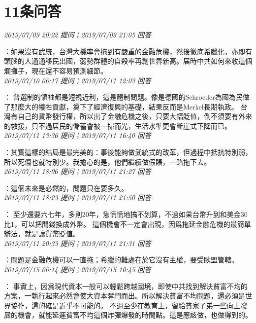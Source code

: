 \documentclass[twocolumn]{ctexart}
\begin{document}
\section{11条问答}

\textit{\hfill\noindent\small 2019/07/09 20:22 提问；2019/07/09 21:05 回答}

：如果沒有武統，台灣大機率會拖到有嚴重的金融危機，然後徹底希臘化，亦即有頭腦的人通通移民出國，弱勢群體的自殺率再創世界新高。届時中共如何來收這個爛攤子，現在還不容易預測細節。
\\

\textit{\hfill\noindent\small 2019/07/10 06:17 提问；2019/07/11 12:03 回答}

：
普選制的領袖都是短視近利，這是體制問題。像是德國的Schroeder為國為民做了那麼大的犧牲貢獻，奠下了經濟復興的基礎，結果反而是Merkel長期執政。 
台灣有自己的貨幣發行權，所以出了金融危機之後，只要大幅貶值，倒不須要有外來的救援，只不過居民的儲蓄會被一掃而光，生活水準更會斷崖式下降而已。
\\

\textit{\hfill\noindent\small 2019/07/11 13:36 提问；2019/07/11 16:40 回答}

：其實這樣的結局是最完美的：事後能夠做武統式的改革，但過程中抵抗特別弱，所以死傷也就特別少。我擔心的是，他們繼續做假賬，一路拖下去。
\\

\textit{\hfill\noindent\small 2019/07/11 18:06 提问；2019/07/11 21:27 回答}

：這個未來是必然的，問題只在要多久。
\\

\textit{\hfill\noindent\small 2019/07/11 18:23 提问；2019/07/11 21:50 回答}

：
至少還要六七年，多則20年，急慌慌地搞不划算，不過如果台幣升到和美金30比1，可以把閒錢換成外幣。
這個機會不一定會出現，因爲拖延金融危機的最簡單辦法，就是讓貨幣貶值。
\\

\textit{\hfill\noindent\small 2019/07/11 20:33 提问；2019/07/11 21:31 回答}

：問題是金融危機可以一直拖；希臘的難處在於它沒有主權，要受歐盟管轄。
\\

\textit{\hfill\noindent\small 2019/07/15 06:14 提问；2019/07/15 10:45 回答}

：
事實上，因爲現代資本一般可以輕鬆跨越國境，即使中共找到解決貧富不均的方案，一執行起來必然會使大資本奪門而出。所以解決貧富不均問題，還必須是世界協作，這的確是近乎不可能的。
不過至少在教育上，留給貧家子弟一些向上發展的機會，就能延遲貧富不均這個炸彈爆發的時間點。這是應該做，也做得到的。
\\
\end{document}
